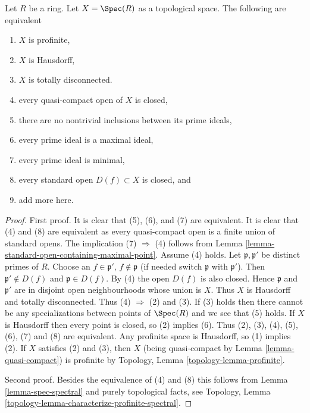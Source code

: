 \begin{lemma}
\label{lemma-ring-with-only-minimal-primes}
Let $R$ be a ring. Let $X = \Spec(R)$ as a topological space.
The following are equivalent
\begin{enumerate}
\item $X$ is profinite,
\item $X$ is Hausdorff,
\item $X$ is totally disconnected.
\item every quasi-compact open of $X$ is closed,
\item there are no nontrivial inclusions between its prime ideals,
\item every prime ideal is a maximal ideal,
\item every prime ideal is minimal,
\item every standard open $D(f) \subset X$ is closed, and
\item add more here.
\end{enumerate}
\end{lemma}

\begin{proof}
First proof. It is clear that (5), (6), and (7) are equivalent.
It is clear that (4) and (8) are equivalent as every quasi-compact
open is a finite union of standard opens.
The implication (7) $\Rightarrow$ (4) follows from
Lemma \ref{lemma-standard-open-containing-maximal-point}.
Assume (4) holds. Let $\mathfrak p, \mathfrak p'$ be distinct
primes of $R$. Choose an $f \in \mathfrak p'$, $f \not \in \mathfrak p$
(if needed switch $\mathfrak p$ with $\mathfrak p'$).
Then $\mathfrak p' \not \in D(f)$ and $\mathfrak p \in D(f)$.
By (4) the open $D(f)$ is also closed.
Hence $\mathfrak p$ and $\mathfrak p'$ are in disjoint open
neighbourhoods whose union is $X$. Thus $X$ is Hausdorff and totally
disconnected. Thus (4) $\Rightarrow$ (2) and (3).
If (3) holds then there cannot be any specializations
between points of $\Spec(R)$ and we see that (5) holds.
If $X$ is Hausdorff then every point is closed, so (2) implies (6).
Thus (2), (3), (4), (5), (6), (7) and (8) are equivalent.
Any profinite space is Hausdorff, so (1) implies (2).
If $X$ satisfies (2) and (3), then $X$ (being quasi-compact by
Lemma \ref{lemma-quasi-compact}) is profinite by
Topology, Lemma \ref{topology-lemma-profinite}.

\medskip\noindent
Second proof. Besides the equivalence of (4) and (8) this follows
from Lemma \ref{lemma-spec-spectral} and purely topological facts, see
Topology, Lemma \ref{topology-lemma-characterize-profinite-spectral}.
\end{proof}













